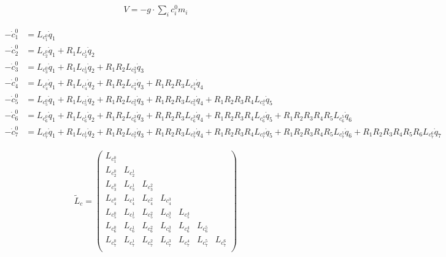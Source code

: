 {\begin{align*}
    V = - g \cdot \sum_i c^0_i m_i
\end{align*}


\begin{align*}
    - \dot{c}_1^0 &= L_{c_1^0} \dot{q}_1 \\
    - \dot{c}_2^0 &= L_{c_2^0} \dot{q}_1 + R_1 L_{c_2^1} \dot{q}_2 \\
    - \dot{c}_3^0 &= L_{c_3^0} \dot{q}_1 + R_1 L_{c_3^1} \dot{q}_2 + R_1 R_2 L_{c_3^2} \dot{q}_3 \\
    - \dot{c}_4^0 &= L_{c_4^0} \dot{q}_1 + R_1 L_{c_4^1} \dot{q}_2 + R_1 R_2 L_{c_4^2} \dot{q}_3 + R_1 R_2 R_3 L_{c_4^3} \dot{q}_4 \\
    - \dot{c}_5^0 &= L_{c_5^0} \dot{q}_1 + R_1 L_{c_5^1} \dot{q}_2 + R_1 R_2 L_{c_5^2} \dot{q}_3 + R_1 R_2 R_3 L_{c_5^3} \dot{q}_4 + R_1 R_2 R_3 R_4 L_{c_5^4} \dot{q}_5 \\
    - \dot{c}_6^0 &= L_{c_6^0} \dot{q}_1 + R_1 L_{c_6^1} \dot{q}_2 + R_1 R_2 L_{c_6^2} \dot{q}_3 + R_1 R_2 R_3 L_{c_6^3} \dot{q}_4 + R_1 R_2 R_3 R_4 L_{c_6^4} \dot{q}_5 + R_1 R_2 R_3 R_4 R_5 L_{c_6^5} \dot{q}_6 \\
    - \dot{c}_7^0 &= L_{c_7^0} \dot{q}_1 + R_1 L_{c_7^1} \dot{q}_2 + R_1 R_2 L_{c_7^2} \dot{q}_3 + R_1 R_2 R_3 L_{c_7^3} \dot{q}_4 + R_1 R_2 R_3 R_4 L_{c_7^4} \dot{q}_5 + R_1 R_2 R_3 R_4 R_5 L_{c_7^5} \dot{q}_6 + R_1 R_2 R_3 R_4 R_5 R_6 L_{c_7^6} \dot{q}_7
\end{align*}

\begin{align*}
    \tilde{L}_c =
    \begin{pmatrix}
        L_{c_1^0} &           &           &           &           &           &           \\
        L_{c_2^0} & L_{c_2^1} &           &           &           &           &           \\
        L_{c_3^0} & L_{c_3^1} & L_{c_3^2} &           &           &           &           \\
        L_{c_4^0} & L_{c_4^1} & L_{c_4^2} & L_{c_4^3} &           &           &           \\
        L_{c_5^0} & L_{c_5^1} & L_{c_5^2} & L_{c_5^3} & L_{c_5^4} &           &           \\
        L_{c_6^0} & L_{c_6^1} & L_{c_6^2} & L_{c_6^3} & L_{c_6^4} & L_{c_6^5} &           \\
        L_{c_7^0} & L_{c_7^1} & L_{c_7^2} & L_{c_7^3} & L_{c_7^4} & L_{c_7^5} & L_{c_7^6} \\
    \end{pmatrix}
\end{align*}


}
